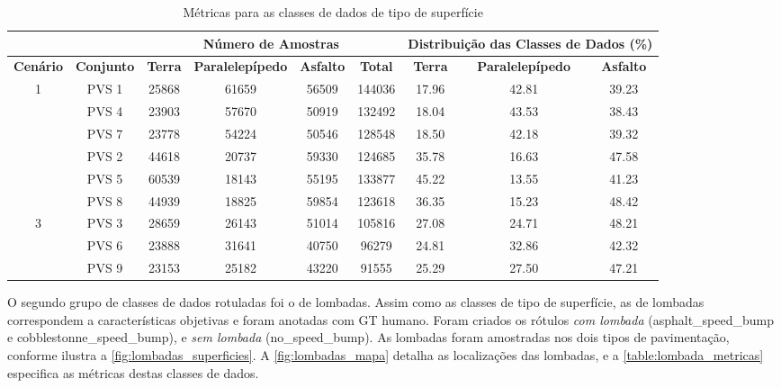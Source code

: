 \begin{table}[H]
\scriptsize
\centering
\caption{Métricas para as classes de dados de tipo de superfície} 
\label{table:tipos_superficie_metricas}
\begin{tabular}{ccccccccc}
\cmidrule(l){3-9} & & 
\multicolumn{4}{c}{\textbf{Número de Amostras}} & 
\multicolumn{3}{c}{\textbf{Distribuição das Classes de Dados (\%)}} 
\\ \midrule

\multicolumn{1}{c}{\textbf{Cenário}} &
\textbf{Conjunto} &
\textbf{Terra} &
\textbf{Paralelepípedo} &
\textbf{Asfalto} & 
\textbf{Total} &
\textbf{Terra} &
\textbf{Paralelepípedo} &
\textbf{Asfalto}
\\ \midrule

\multicolumn{1}{c}{\multirow{4}{*}{1}} & PVS 1 & 25868 & 61659 & 56509 & 144036 & 17.96 & 42.81 & 39.23 \\ \cmidrule(l){2-9} 
\multicolumn{1}{c}{} & PVS 4 & 23903 & 57670 & 50919 & 132492 & 18.04 & 43.53 & 38.43 \\ \cmidrule(l){2-9} 
\multicolumn{1}{c}{} & PVS 7 & 23778 & 54224 & 50546 & 128548 & 18.50 & 42.18 & 39.32 \\ \midrule

\multicolumn{1}{c}{\multirow{4}{*}{2}} & PVS 2 & 44618 & 20737 & 59330 & 124685 & 35.78 & 16.63 & 47.58 \\ \cmidrule(l){2-9} 
\multicolumn{1}{c}{} & PVS 5 & 60539 & 18143 & 55195 & 133877 & 45.22 & 13.55 & 41.23 \\ \cmidrule(l){2-9} 
\multicolumn{1}{c}{} & PVS 8 & 44939 & 18825 & 59854 & 123618 & 36.35 & 15.23 & 48.42 \\ \midrule

\multicolumn{1}{c}{\multirow{4}{*}{3}} & PVS 3 & 28659 & 26143 & 51014 & 105816 & 27.08 & 24.71 & 48.21 \\ \cmidrule(l){2-9} 
\multicolumn{1}{c}{} & PVS 6 & 23888 & 31641 & 40750 & 96279 & 24.81 & 32.86 & 42.32 \\ \cmidrule(l){2-9} 
\multicolumn{1}{c}{} & PVS 9 & 23153 & 25182 & 43220 & 91555 & 25.29 & 27.50 & 47.21 \\ \bottomrule

\end{tabular}
\end{table}

O segundo grupo de classes de dados rotuladas foi o de lombadas. Assim como as classes de tipo de superfície, as de lombadas correspondem a características objetivas e foram anotadas com GT humano. Foram criados os rótulos \emph{com lombada} (asphalt\_speed\_bump e cobblestonne\_speed\_bump), e \emph{sem lombada} (no\_speed\_bump). As lombadas foram amostradas nos dois tipos de pavimentação, conforme ilustra a \autoref{fig:lombadas_superficies}. A \autoref{fig:lombadas_mapa} detalha as localizações das lombadas, e a \autoref{table:lombada_metricas} especifica as métricas destas classes de dados.


